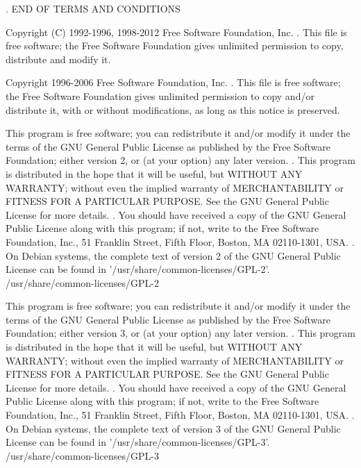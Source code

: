 \begin{script}
 .
                      END OF TERMS AND CONDITIONS

 Copyright (C) 1992-1996, 1998-2012 Free Software Foundation, Inc.
 .
 This file is free software; the Free Software Foundation
 gives unlimited permission to copy, distribute and modify it.

 Copyright 1996-2006 Free Software Foundation, Inc.
 .
 This file is free software; the Free Software Foundation gives
 unlimited permission to copy and/or distribute it, with or without
 modifications, as long as this notice is preserved.

 This program is free software; you can redistribute it and/or modify
 it under the terms of the GNU General Public License as published by
 the Free Software Foundation; either version 2, or (at your option)
 any later version.
 .
 This program is distributed in the hope that it will be useful,
 but WITHOUT ANY WARRANTY; without even the implied warranty of
 MERCHANTABILITY or FITNESS FOR A PARTICULAR PURPOSE.  See the
 GNU General Public License for more details.
 .
 You should have received a copy of the GNU General Public License
 along with this program; if not, write to the Free Software
 Foundation, Inc., 51 Franklin Street, Fifth Floor, Boston, MA
 02110-1301, USA.
 .
 On Debian systems, the complete text of version 2 of the GNU General
 Public License can be found in '/usr/share/common-licenses/GPL-2'.
 /usr/share/common-licenses/GPL-2

 This program is free software; you can redistribute it and/or modify
 it under the terms of the GNU General Public License as published by
 the Free Software Foundation; either version 3, or (at your option)
 any later version.
 .
 This program is distributed in the hope that it will be useful,
 but WITHOUT ANY WARRANTY; without even the implied warranty of
 MERCHANTABILITY or FITNESS FOR A PARTICULAR PURPOSE.  See the
 GNU General Public License for more details.
 .
 You should have received a copy of the GNU General Public License
 along with this program; if not, write to the Free Software
 Foundation, Inc., 51 Franklin Street, Fifth Floor, Boston, MA
 02110-1301, USA.
 .
 On Debian systems, the complete text of version 3 of the GNU General
 Public License can be found in '/usr/share/common-licenses/GPL-3'.
 /usr/share/common-licenses/GPL-3

\end{script}
